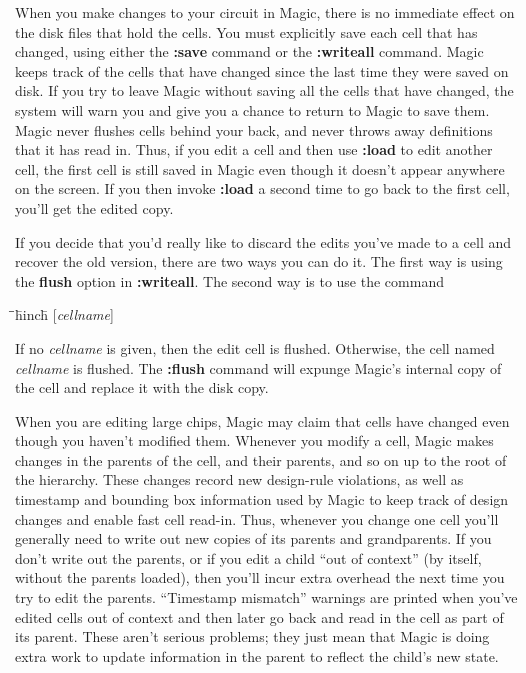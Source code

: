 \documentclass[letterpaper,twoside,12pt]{article}
\def\hinch{\hspace*{0.5in}}
\def\starti{\begin{center}\begin{tabbing}\hinch\=\hinch\=\hinch\=hinch\hinch\=\kill}
\def\endi{\end{tabbing}\end{center}}
\def\ii{\>\>\>}
\begin{document}
When you make changes to your circuit in Magic, there is
no immediate effect on the disk files that hold the cells.
You must explicitly save each cell that has changed, using
either the {\bfseries :save} command or the {\bfseries :writeall} command.
Magic keeps track of the cells that
have changed since the last time they were saved
on disk.  If you try to leave Magic without saving all the
cells that have changed, the system will warn you and give
you a chance to return to Magic to save them.  Magic never
flushes cells behind your back, and never throws away
definitions that it has read in.  Thus, if you edit a cell
and then use {\bfseries :load} to edit another cell, the first
cell is still saved in Magic even though it doesn't appear
anywhere on the screen.  If you then invoke {\bfseries :load}
a second time to go back to the first cell, you'll get the
edited copy.

If you decide that you'd really like to discard the edits
you've made to a cell and recover the old version, there
are two ways you can do it.  The first way is using the
{\bfseries flush} option in {\bfseries :writeall}.  The second way is
to use the command

\starti
   \ii {\bfseries :flush }[{\itshape cellname}]
\endi

If no {\itshape cellname} is given, then the edit cell is flushed.
Otherwise, the cell named {\itshape cellname} is flushed.  The
{\bfseries :flush} command will expunge Magic's internal copy of the
cell and replace it with the disk copy.

When you are editing large chips, Magic may claim that cells
have changed even though you haven't modified them.  Whenever
you modify a cell, Magic makes changes in the parents of the
cell, and their parents, and so on up to the root of the
hierarchy.  These changes record new design-rule violations,
as well as timestamp and bounding box information used by
Magic to keep track of design changes and enable fast cell
read-in.  Thus, whenever you change one cell you'll generally
need to write out new copies of its parents and grandparents.
If you don't write out the parents, or if you edit a child
``out of context'' (by itself, without the parents loaded),
then you'll incur extra overhead the next time you try to edit
the parents.  ``Timestamp mismatch'' warnings are printed
when you've edited cells out of context and then later go back
and read in the cell as part of its parent.  These aren't serious
problems;  they just mean that Magic is doing extra work to
update information in the parent to reflect the child's new state.
\end{document}

